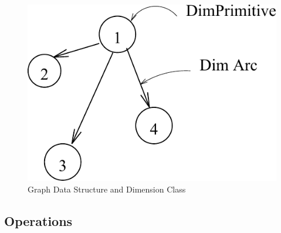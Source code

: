         \begin{figure}[htbp]
            \hspace{2cm}
            \includegraphics[scale=1.3]{DIMDATA.pdf}
            \caption{Graph Data Structure and Dimension Class}
            \label{dimdata}
        \end{figure}

		
        \subsection{Operations}

